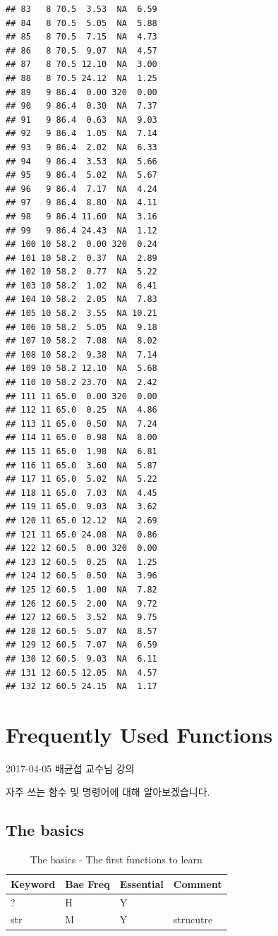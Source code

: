\documentclass[11pt,]{krantz}
\renewenvironment{quote}{\begin{VF}}{\end{VF}}
\theoremstyle{definition}
\theoremstyle{definition}
\theoremstyle{remark}
\begin{document}
\begin{verbatim}
## 83   8 70.5  3.53  NA  6.59
## 84   8 70.5  5.05  NA  5.88
## 85   8 70.5  7.15  NA  4.73
## 86   8 70.5  9.07  NA  4.57
## 87   8 70.5 12.10  NA  3.00
## 88   8 70.5 24.12  NA  1.25
## 89   9 86.4  0.00 320  0.00
## 90   9 86.4  0.30  NA  7.37
## 91   9 86.4  0.63  NA  9.03
## 92   9 86.4  1.05  NA  7.14
## 93   9 86.4  2.02  NA  6.33
## 94   9 86.4  3.53  NA  5.66
## 95   9 86.4  5.02  NA  5.67
## 96   9 86.4  7.17  NA  4.24
## 97   9 86.4  8.80  NA  4.11
## 98   9 86.4 11.60  NA  3.16
## 99   9 86.4 24.43  NA  1.12
## 100 10 58.2  0.00 320  0.24
## 101 10 58.2  0.37  NA  2.89
## 102 10 58.2  0.77  NA  5.22
## 103 10 58.2  1.02  NA  6.41
## 104 10 58.2  2.05  NA  7.83
## 105 10 58.2  3.55  NA 10.21
## 106 10 58.2  5.05  NA  9.18
## 107 10 58.2  7.08  NA  8.02
## 108 10 58.2  9.38  NA  7.14
## 109 10 58.2 12.10  NA  5.68
## 110 10 58.2 23.70  NA  2.42
## 111 11 65.0  0.00 320  0.00
## 112 11 65.0  0.25  NA  4.86
## 113 11 65.0  0.50  NA  7.24
## 114 11 65.0  0.98  NA  8.00
## 115 11 65.0  1.98  NA  6.81
## 116 11 65.0  3.60  NA  5.87
## 117 11 65.0  5.02  NA  5.22
## 118 11 65.0  7.03  NA  4.45
## 119 11 65.0  9.03  NA  3.62
## 120 11 65.0 12.12  NA  2.69
## 121 11 65.0 24.08  NA  0.86
## 122 12 60.5  0.00 320  0.00
## 123 12 60.5  0.25  NA  1.25
## 124 12 60.5  0.50  NA  3.96
## 125 12 60.5  1.00  NA  7.82
## 126 12 60.5  2.00  NA  9.72
## 127 12 60.5  3.52  NA  9.75
## 128 12 60.5  5.07  NA  8.57
## 129 12 60.5  7.07  NA  6.59
## 130 12 60.5  9.03  NA  6.11
## 131 12 60.5 12.05  NA  4.57
## 132 12 60.5 24.15  NA  1.17
\end{verbatim}

\chapter{Frequently Used Functions}\label{frequently-used-functions}

\begin{quote}
2017-04-05 배균섭 교수님 강의
\end{quote}

자주 쓰는 함수 및 명령어에 대해 알아보겠습니다.

\section{The basics}\label{the-basics}

\begin{longtable}[t]{llll}
\caption{\label{tab:knitchunk1}The basics - The first functions to learn}\\
\toprule
Keyword & Bae Freq & Essential & Comment\\
\midrule
? & H & Y & \\
str & M & Y & strucutre\\
\bottomrule
\end{longtable}
\end{document}
